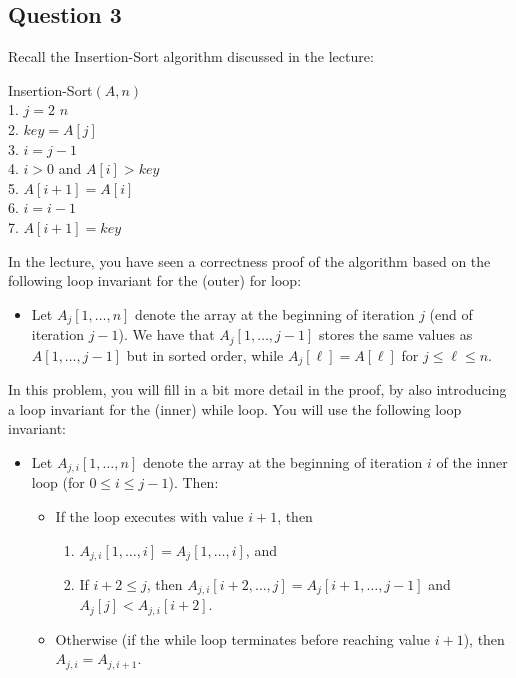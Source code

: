 \subsection*{Question 3}
Recall the {\sc Insertion-Sort} algorithm discussed in the lecture:
\begin{code}
	{\sc Insertion-Sort}$(A,n)$\\
	1. \> \For $j=2$ \To $n$\\
	2. \> \> $key=A[j]$\\
	3. \> \> $i=j-1$\\
	4. \> \> \While $i>0$ and $A[i]>key$\\
	5. \> \> \> $A[i+1]=A[i]$\\
	6. \> \> \> $i=i-1$\\
	7. \> \> $A[i+1]=key$
\end{code}

\noindent
In the lecture, you have seen a correctness proof of the algorithm based on the following loop invariant for the (outer) for loop:
\begin{itemize}
	\item Let $A_j[1,\ldots,n]$ denote the array at the beginning of iteration $j$ (end of iteration $j-1$). We have that $A_j[1,\ldots,j-1]$ stores the same values as $A[1,\ldots,j-1]$ but in sorted order, while $A_j[\ell] = A[\ell]$ for $j \leq \ell \leq n$. 
\end{itemize}
In this problem, you will fill in a bit more detail in the proof, by also introducing a loop invariant for the (inner) while loop. You will use the following loop invariant:
\begin{itemize}
	\item Let $A_{j,i}[1,\ldots,n]$ denote the array at the beginning of iteration $i$ of the inner loop (for $0 \leq i \leq j-1$). 
    Then:
    \begin{itemize}
        \item If the loop executes with value $i+ 1$, then 
        \begin{enumerate}[nosep]
		\item $A_{j,i}[1,\ldots,i] = A_j[1,\ldots,i]$, and
		\item If $i+2 \leq j$, then $A_{j,i}[i+2,\ldots,j] = A_j[i+1,\ldots,j-1]$ and $A_j[j] < A_{j,i}[i+2]$.
	\end{enumerate}
 \item Otherwise (if the while loop terminates before reaching value $i + 1$), then $A_{j,i} = A_{j,i+1}$.
    \end{itemize}

\end{itemize}


